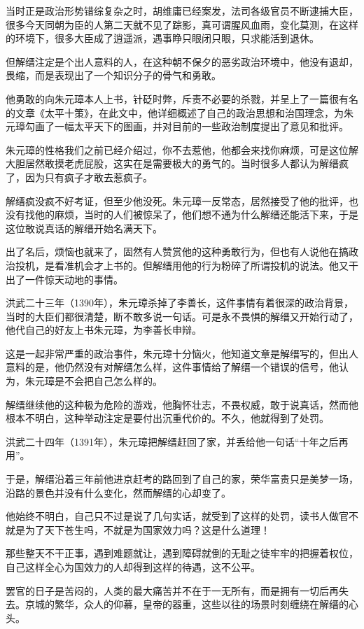 \begin{multicols}{\theparacolNo}
当时正是政治形势错综复杂之时，胡维庸已经案发，法司各级官员不断逮捕大臣，很多今天同朝为臣的人第二天就不见了踪影，真可谓腥风血雨，变化莫测，在这样的环境下，很多大臣成了逍遥派，遇事睁只眼闭只眼，只求能活到退休。

但解缙注定是个出人意料的人，在这种朝不保夕的恶劣政治环境中，他没有退却，畏缩，而是表现出了一个知识分子的骨气和勇敢。

他勇敢的向朱元璋本人上书，针砭时弊，斥责不必要的杀戮，并呈上了一篇很有名的文章《太平十策》，在此文中，他详细概述了自己的政治思想和治国理念，为朱元璋勾画了一幅太平天下的图画，并对目前的一些政治制度提出了意见和批评。

朱元璋的性格我们之前已经介绍过，你不去惹他，他都会来找你麻烦，可是这位解大胆居然敢摸老虎屁股，这实在是需要极大的勇气的。当时很多人都认为解缙疯了，因为只有疯子才敢去惹疯子。

解缙疯没疯不好考证，但至少他没死。朱元璋一反常态，居然接受了他的批评，也没有找他的麻烦，当时的人们被惊呆了，他们想不通为什么解缙还能活下来，于是这位敢说真话的解缙开始名满天下。

出了名后，烦恼也就来了，固然有人赞赏他的这种勇敢行为，但也有人说他在搞政治投机，是看准机会才上书的。但解缙用他的行为粉碎了所谓投机的说法。他又干出了一件惊天动地的事情。

洪武二十三年（1390年），朱元璋杀掉了李善长，这件事情有着很深的政治背景，当时的大臣们都很清楚，断不敢多说一句话。可是永不畏惧的解缙又开始行动了，他代自己的好友上书朱元璋，为李善长申辩。

这是一起非常严重的政治事件，朱元璋十分恼火，他知道文章是解缙写的，但出人意料的是，他仍然没有对解缙怎么样，这件事情给了解缙一个错误的信号，他认为，朱元璋是不会把自己怎么样的。

解缙继续他的这种极为危险的游戏，他胸怀壮志，不畏权威，敢于说真话，然而他根本不明白，这种举动注定是要付出沉重代价的。不久，他就得到了处罚。

洪武二十四年（1391年），朱元璋把解缙赶回了家，并丢给他一句话“十年之后再用”。

于是，解缙沿着三年前他进京赶考的路回到了自己的家，荣华富贵只是美梦一场，沿路的景色并没有什么变化，然而解缙的心却变了。

他始终不明白，自己只不过是说了几句实话，就受到了这样的处罚，读书人做官不就是为了天下苍生吗，不就是为国家效力吗？这是什么道理！

那些整天不干正事，遇到难题就让，遇到障碍就倒的无耻之徒牢牢的把握着权位，自己这样全心为国效力的人却得到这样的待遇，这不公平。

罢官的日子是苦闷的，人类的最大痛苦并不在于一无所有，而是拥有一切后再失去。京城的繁华，众人的仰慕，皇帝的器重，这些以往的场景时刻缠绕在解缙的心头。


\end{multicols}
